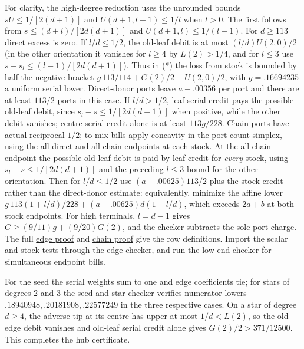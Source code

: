 \documentclass[11pt]{article}
\newcommand{\proofsrc}[2]{\href{https://github.com/uzay-eth/friend-tree-exponent/blob/a0972085ad72ad5685ae7b424988648d1965e73c/#1}{#2}}
\theoremstyle{remark}
\numberwithin{equation}{section}
\begin{document}
For clarity, the high-degree reduction uses the unrounded bounds $sU\le1/[2(d+1)]$ and $U(d+1,l-1)\le1/l$ when $l>0$. The first follows from $s\le(d+l)/[2d(d+1)]$ and $U(d+1,l)\le1/(l+1)$. For $d\ge113$ direct excess is zero. If $l/d\le1/2$, the old-leaf debit is at most $(l/d) U(2,0)/2$ (in the other orientation it vanishes for $l\ge4$ by $L(2)>1/4$, and for $l\le3$ use $s-s_l\le(l-1)/[2d(d+1)]$). Thus in (*) the loss from stock is bounded by half the negative bracket $g\,113/114+G(2)/2-U(2,0)/2$, with $g=.16694235$ a uniform serial lower. Direct-donor ports leave $a-.00356$ per port and there are at least $113/2$ ports in this case. If $l/d>1/2$, leaf serial credit pays the possible old-leaf debit, since $s_l-s\le1/[2d(d+1)]$ when positive, while the other debit vanishes; centre serial credit alone is at least $113g/228$. Chain ports have actual reciprocal $1/2$; to mix bills apply concavity in the port-count simplex, using the all-direct and all-chain endpoints at each stock. At the all-chain endpoint the possible old-leaf debit is paid by leaf credit for \emph{every} stock, using $s_l-s\le1/[2d(d+1)]$ and the preceding $l\le3$ bound for the other orientation. Then for $l/d\le1/2$ use $(a-.00625)113/2$ plus the stock credit rather than the direct-donor estimate: equivalently, minimize the affine lower $g\,113(1+l/d)/228+(a-.00625)d(1-l/d)$, which exceeds $2a+b$ at both stock endpoints. For high terminals, $l=d-1$ gives $C\ge(9/11)g+(9/20)G(2)$, and the checker subtracts the sole port charge. The full \proofsrc{round2/proofs/astra-late/source/round2/open/age-order/global-transport/hostile/edge-dual/README.md}{edge proof} and \proofsrc{round2/proofs/astra-late/source/round2/open/age-order/global-transport/hostile/interfaces/low-end.md}{chain proof} give the row definitions. Import the scalar and stock tests through the edge checker, and run the low-end checker for simultaneous endpoint bills.

For the seed the serial weights sum to one and edge coefficients tie; for stars of degrees 2 and 3 the \proofsrc{round2/proofs/astra-late/source/round2/open/age-order/hub-ranking/check.py}{seed and star checker} verifies numerator lowers $.18940948,.20181908,.22577249$ in the three respective cases. On a star of degree $d\ge4$, the adverse tip at its centre has upper at most $1/d<L(2)$, so the old-edge debit vanishes and old-leaf serial credit alone gives $G(2)/2>371/12500$. This completes the hub certificate.
\end{document}
